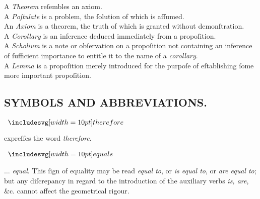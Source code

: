 \begin{minipage}{0.80\textwidth}
    A \textit{Theorem} reſembles an axiom.\\

    A \textit{Poſtulate} is a problem, the ſolution of which is aſſumed.\\

    An \textit{Axiom} is a theorem, the truth of which is granted without demonſtration.\\

    A \textit{Corollary} is an inference deduced immediately from a propoſition.\\

    A \textit{Scholium} is a note or obſervation on a propoſition not containing an inference of ſufficient importance to entitle it to the name of a \textit{corollary}.\\

    A \textit{Lemma} is a propoſition merely introduced for the purpoſe of eſtablishing ſome more important propoſition.
\end{minipage}

\pagebreak

\pagestyle{fancy}
\fancyhf{}
\renewcommand{\headrulewidth}{0pt}
%

\subsection[Symbols and Abbreviations]{\centering \scshape{\LARGE{SYMBOLS AND ABBREVIATIONS.}}}
\label{subsec:symbolsandabbreviations}

\hfill

\begin{minipage}[t]{0.20\textwidth}
    \begin{center}
        $\btherefore$
    \end{center}
\end{minipage}%
\begin{minipage}[t]{0.80\textwidth}
    expreſſes the word \textit{therefore}.
\end{minipage}

\begin{minipage}[t]{0.20\textwidth}
    \begin{center}
        $\bequals$
    \end{center}
\end{minipage}%
\begin{minipage}[t]{0.80\textwidth}
    $\ldots$ \textit{equal}. This ſign of equality may be read \textit{equal to}, or \textit{is equal to}, or \textit{are equal to}; but any diſcrepancy in regard to the introduction of the auxiliary verbs \textit{is, are}, \&c. cannot affect the geometrical rigour.
\end{minipage}


